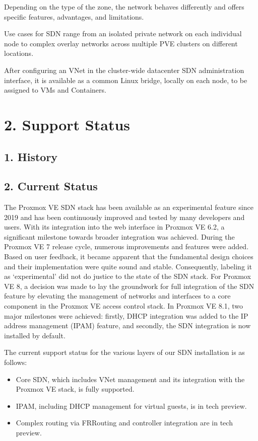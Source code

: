 Depending on the type of the zone, the network behaves differently and offers specific features, advantages, and limitations.

Use cases for SDN range from an isolated private network on each individual node to complex overlay networks across multiple PVE clusters on different locations.

After configuring an VNet in the cluster-wide datacenter SDN administration interface, it is available as a common Linux bridge, locally on each node, to be assigned to VMs and Containers.


\section{2. Support Status}

\subsection{1. History}

\subsection{2. Current Status}

The Proxmox VE SDN stack has been available as an experimental feature since 2019 and has been continuously improved and tested by many developers and users. With its integration into the web interface in Proxmox VE 6.2, a significant milestone towards broader integration was achieved. During the Proxmox VE 7 release cycle, numerous improvements and features were added. Based on user feedback, it became apparent that the fundamental design choices and their implementation were quite sound and stable. Consequently, labeling it as ‘experimental’ did not do justice to the state of the SDN stack. For Proxmox VE 8, a decision was made to lay the groundwork for full integration of the SDN feature by elevating the management of networks and interfaces to a core component in the Proxmox VE access control stack. In Proxmox VE 8.1, two major milestones were achieved: firstly, DHCP integration was added to the IP address management (IPAM) feature, and secondly, the SDN integration is now installed by default.

The current support status for the various layers of our SDN installation is as follows:

\begin{itemize}[leftmargin=2cm]

	\item Core SDN, which includes VNet management and its integration with the Proxmox VE stack, is fully supported.

	\item IPAM, including DHCP management for virtual guests, is in tech preview.

	\item Complex routing via FRRouting and controller integration are in tech preview.

\end{itemize}


